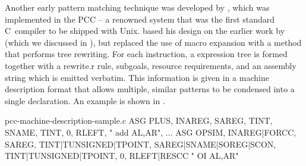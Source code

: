 Another early \gls{pattern matching} technique was developed by
\textcite{Johnson:1978}, which was implemented in the \gls{PCC} -- a renowned
system that was the first standard \gls{C}~\gls{compiler} to be shipped with
\gls{Unix}.
%
\citeauthor{Johnson:1978} based his design on the earlier work by
\textcite{Snyder:1975} (which we discussed in
), but replaced the use of
\gls{macro expansion} with a method that performs \gls{tree rewriting}.
%
For each \gls{instruction}, a \gls{expression tree} is formed together with a
\gls{rewrite.r} \gls{rule}, subgoals, resource requirements, and an assembly
string which is emitted verbatim.
%
This information is given in a \gls{machine description} format that allows
multiple, similar \glspl{pattern} to be condensed into a single declaration.
%
An example is shown in .

\begin{filecontents*}{pcc-machine-description-sample.c}
ASG PLUS,   INAREG,
            SAREG,   TINT,
            SNAME,   TINT,
                     0,      RLEFT,
                     "       add      AL,AR\n",
...
ASG OPSIM,   INAREG|FORCC,
             SAREG,      TINT|TUNSIGNED|TPOINT,
             SAREG|SNAME|SOREG|SCON,   TINT|TUNSIGNED|TPOINT,
                         0,            RLEFT|RESCC
                         "             OI            AL,AR\n"
\end{filecontents*}

